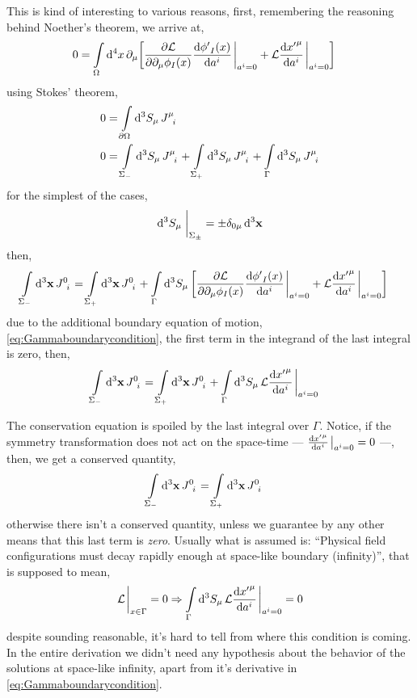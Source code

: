 This is kind of interesting to various reasons, first, remembering the reasoning behind Noether's theorem, we arrive at,
\begin{align}
    0&=\int\limits_{\Omega}\dd[4]{x}\partial_\mu\qty[\pdv{\mathcal L}{\partial_\mu\phi_I\qty(x)}\dv{{\phi'}_I\qty(x)}{a^i}\eval_{a^i=0}+\mathcal L\dv{{x'}^\mu}{a^i}\eval_{a^i=0}]
\end{align}
using Stokes' theorem,
\begin{align}
    0&=\int\limits_{\partial\Omega}\dd[3]{S_\mu}\tensor{J}{^\mu_i}\\
    0&=\int\limits_{\Sigma_-}\dd[3]{S_\mu}\tensor{J}{^\mu_i}+\int\limits_{\Sigma_+}\dd[3]{S_\mu}\tensor{J}{^\mu_i}+\int\limits_{\Gamma}\dd[3]{S_\mu}\tensor{J}{^\mu_i}
\end{align}
for the simplest of the cases,
\begin{align}
    \dd[3]{S_\mu}\eval_{\Sigma_\pm} = \pm\delta_{0\mu}\dd[3]{\vb x}
\end{align}
then,
\begin{align}
    \int\limits_{\Sigma_-}\dd[3]{\vb x}\tensor{J}{^0_i}&=\int\limits_{\Sigma_+}\dd[3]{\vb x}\tensor{J}{^0_i}+\int\limits_{\Gamma}\dd[3]{S_\mu}\qty[\pdv{\mathcal L}{\partial_\mu\phi_I\qty(x)}\dv{{\phi'}_I\qty(x)}{a^i}\eval_{a^i=0}+\mathcal L\dv{{x'}^\mu}{a^i}\eval_{a^i=0}]
\end{align}
due to the additional boundary equation of motion, \cref{eq:Gammaboundarycondition}, the first term in the integrand of the last integral is zero, then,
\begin{align}
    \int\limits_{\Sigma_-}\dd[3]{\vb x}\tensor{J}{^0_i}&=\int\limits_{\Sigma_+}\dd[3]{\vb x}\tensor{J}{^0_i}+\int\limits_{\Gamma}\dd[3]{S_\mu}\mathcal L\dv{{x'}^\mu}{a^i}\eval_{a^i=0}\label{eq:NotConservationEquation}
\end{align}

The conservation equation is spoiled by the last integral over $\Gamma$. Notice, if the symmetry transformation does not act on the space-time --- $\dv{{x'}^\mu}{a^i}\eval_{a^i=0}=0$ ---, then, we get a conserved quantity,
\begin{align}
    \int\limits_{\Sigma_-}\dd[3]{\vb x}\tensor{J}{^0_i}&=\int\limits_{\Sigma_+}\dd[3]{\vb x}\tensor{J}{^0_i}
\end{align}
otherwise there isn't a conserved quantity, unless we guarantee by any other means that this last term is \textit{zero}. Usually what is assumed is: ``Physical field configurations must decay rapidly enough at space-like boundary (infinity)'', that is supposed to mean,
\begin{align}
    \mathcal L\eval_{x\in\Gamma}=0\Rightarrow \int\limits_{\Gamma}\dd[3]{S_\mu}\mathcal L\dv{{x'}^\mu}{a^i}\eval_{a^i=0}=0
\end{align}
despite sounding reasonable, it's hard to tell from where this condition is coming. In the entire derivation we didn't need any hypothesis about the behavior of the solutions at 
space-like infinity, apart from it's derivative in \cref{eq:Gammaboundarycondition}.

